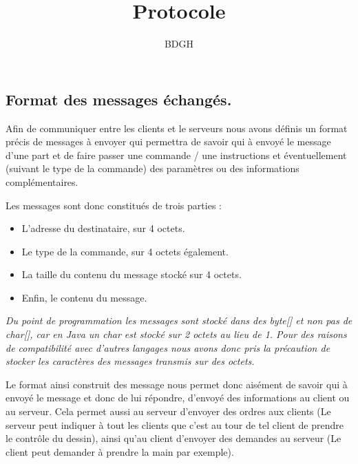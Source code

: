 \documentclass[a4paper,10pt]{article}
\title{Protocole}
\author{BDGH}
\date{}
\begin{document}
\maketitle
{}
\begin{multicols}{2}

\section{Format des messages échangés.}
Afin de communiquer entre les clients et le serveurs nous avons définis un format précis de messages à envoyer qui permettra de savoir qui à envoyé le message d'une part et de faire passer une commande / une instructions et éventuellement (suivant le type de la commande) des paramètres ou des informations complémentaires.

Les messages sont donc constitués de trois parties : 
\begin{itemize}
\item[1] L'adresse du destinataire, sur 4 octets.
\item[2] Le type de la commande, sur 4 octets également.
\item[3] La taille du contenu du message stocké sur 4 octets.
\item[4] Enfin, le contenu du message.
\end{itemize}

\textit{Du point de programmation les messages sont stocké dans des byte[] et non pas de char[], car en Java un char est stocké sur 2 octets au lieu de 1. Pour des raisons de compatibilité avec d'autres langages nous avons donc pris la précaution de stocker les caractères des messages transmis sur des octets.}

Le format ainsi construit des message nous permet donc aisément de savoir qui à envoyé le message et donc de lui répondre, d'envoyé des informations au client ou au serveur. Cela permet aussi au serveur d'envoyer des ordres aux clients (Le serveur peut indiquer à tout les clients que c'est au tour de tel client de prendre le contrôle du dessin), ainsi qu'au client d'envoyer des demandes au serveur (Le client peut demander à prendre la main par exemple).


\end{multicols}
\end{document}
